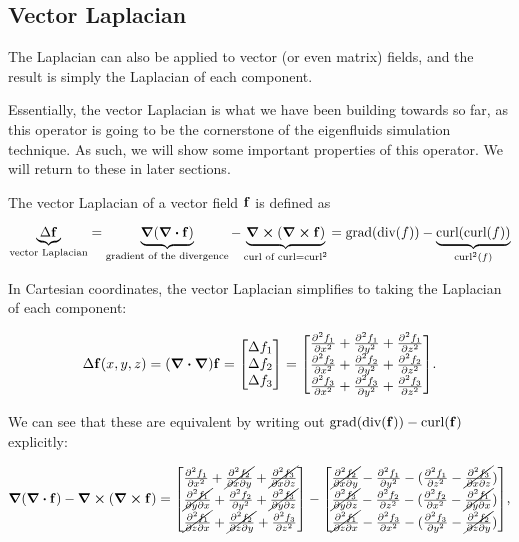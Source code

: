 \subsection*{Vector Laplacian}
\label{section:vector-laplacian}
The Laplacian can also be applied to vector (or even matrix) fields, and the
result is simply the Laplacian of each component.

Essentially, the vector Laplacian is what we have been building towards so far,
as this operator is going to be the cornerstone of the eigenfluids simulation
technique. As such, we will show some important properties
of this operator. We will return to these in later sections.

The vector Laplacian of a vector field $\vb{f}$ is defined as

$$\underbrace{\Delta \vb{f}}_{\text{vector Laplacian}}
= \underbrace{\grad(\div{\vb{f}})}_{\text{gradient of the divergence}}
- \underbrace{\curl(\curl{\vb{f}})}_{\text{curl of curl} = \text{curl}^2}
= \text{grad}(\text{div}(f))
- \underbrace{\text{curl}(\text{curl}(f))}_{\text{curl}^2(f)}$$

In Cartesian coordinates, the vector Laplacian simplifies to taking the
Laplacian of each component:

\begin{equation}
    \Delta\vb{f}(x, y, z) = (\grad\vdot\grad)\vb{f} = 
    \mqty[ \Delta f_1 \\ \Delta f_2 \\ \Delta f_3 ] =
    \mqty[
        \pdv[2]{f_1}{x} + \pdv[2]{f_1}{y} + \pdv[2]{f_1}{z}\\
        \pdv[2]{f_2}{x} + \pdv[2]{f_2}{y} + \pdv[2]{f_2}{z}\\
        \pdv[2]{f_3}{x} + \pdv[2]{f_3}{y} + \pdv[2]{f_3}{z}
    ].
    \label{eq:laplacian}
\end{equation}

We can see that these are equivalent by writing out
$\text{grad}(\text{div}(\vb{f})) - \text{curl}(\vb{f})$ explicitly:

\begin{equation}\label{eq:graddiv-identity}
    \grad(\div{\vb{f}}) - \curl(\curl{\vb{f}}) =
    \mqty[
        \pdv[2]{f_1}{x} + 
        \cancel{\pdv[2]{f_2}{x}{y}} + 
        \cancel{\pdv[2]{f_3}{x}{z}}
        \\
        \cancel{\pdv[2]{f_1}{y}{x}} + 
        \pdv[2]{f_2}{y} + 
        \cancel{\pdv[2]{f_3}{y}{z}}
        \\
        \cancel{\pdv[2]{f_1}{z}{x}} +
        \cancel{\pdv[2]{f_2}{z}{y}} + 
        \pdv[2]{f_3}{z}
    ] -
    \mqty[
        \cancel{\pdv[2]{f_2}{x}{y}} - 
        \pdv[2]{f_1}{y} - 
        (\pdv[2]{f_1}{z} - \cancel{\pdv[2]{f_3}{x}{z}})
        \\
        \cancel{\pdv[2]{f_3}{y}{z}} - 
        \pdv[2]{f_2}{z} - 
        ({\pdv[2]{f_2}{x}} - \cancel{\pdv[2]{f_1}{y}{x}})
        \\
        \cancel{\pdv[2]{f_1}{z}{x}} - 
        \pdv[2]{f_3}{x} - 
        (\pdv[2]{f_3}{y} - \cancel{\pdv[2]{f_2}{z}{y}})
    ],
\end{equation}

